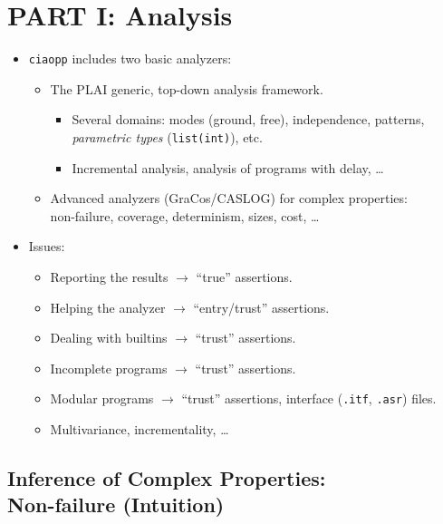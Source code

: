 \documentclass{article}
\renewcommand{\_}{\char'137}
\begin{document}
\newpage
\section{PART I: Analysis}

\begin{itemize}
\item \texttt{ciaopp} includes two basic analyzers:
  \begin{itemize}
  \item The PLAI generic, top-down analysis framework.
    \begin{itemize}
    \item Several domains: modes (ground, free), independence,
      patterns, \emph{parametric types} (\texttt{list(int)}), etc. 
    \item Incremental analysis, analysis of programs with delay, \ldots
    \end{itemize}
  \item Advanced analyzers (GraCos/CASLOG) for complex properties:\\
    non-failure, coverage, determinism, sizes, cost, \ldots 
  \end{itemize}
\item Issues:
  \begin{itemize}
  \item Reporting the results $\rightarrow$ ``true'' assertions.
  \item Helping the analyzer $\rightarrow$ ``entry/trust'' assertions.
  \item Dealing with builtins $\rightarrow$ ``trust'' assertions.
  \item Incomplete programs $\rightarrow$ ``trust'' assertions.
  \item Modular programs $\rightarrow$ ``trust'' assertions, interface
    (\texttt{.itf}, \texttt{.asr}) files.
  \item Multivariance, incrementality, \ldots
  \end{itemize}
\end{itemize}


\subsection{Inference of Complex Properties: \\ Non-failure (Intuition)}
\end{document}
